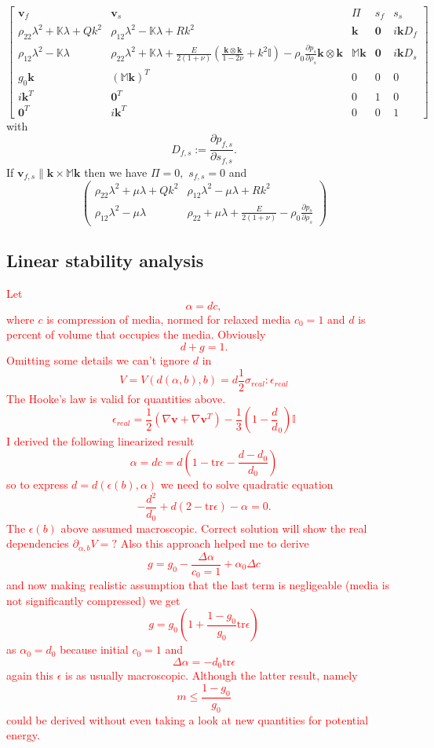 \documentclass[12pt]{article}
\numberwithin{theorem}{section}
\begin{document}
\[\left[\begin{array}{ccccc}
\mathbf{v}_f & \mathbf{v}_s & \Pi & s_f & s_s \\
\rho_{22}\lambda^2 + \mathbb{K}\lambda + Qk^2 &
\rho_{12}\lambda^2 - \mathbb{K}\lambda + Rk^2 &
\mathbf{k} & \mathbf{0} & i\mathbf{k}D_f \\
\rho_{12}\lambda^2 - \mathbb{K}\lambda &
\rho_{22}\lambda^2 + \mathbb{K}\lambda 
+ \frac{E}{2(1+\nu)}\left(\frac{\mathbf{k}\otimes\mathbf{k}}{1-2\nu}+ k^2 \mathbb{I}\right)-\rho_0 \frac{\partial p_s}{\partial \rho_s} \mathbf{k}\otimes\mathbf{k}
&
\mathbb{M}\mathbf{k} & \mathbf{0} & i\mathbf{k}D_s \\
g_0\mathbf{k} & (\mathbb{M}\mathbf{k})^T & 0 & 0 & 0 \\
i\mathbf{k}^T & \mathbf{0}^T & 0 & 1 & 0\\
\mathbf{0}^T & i\mathbf{k}^T & 0 & 0 & 1
\end{array}\right]
\]
with \[D_{f,s}:= \frac{\partial p_{f,s}}{\partial s_{f,s}}.\]
If $\mathbf{v}_{f,s} \parallel \mathbf{k} \times \mathbb{M} \mathbf{k}$ then we have $\Pi = 0,$ $s_{f,s} =0$ and 
\[\left(\begin{array}{cc}
\rho_{22}\lambda^2 + \mu \lambda + Qk^2 & \rho_{12}\lambda^2 - \mu \lambda + Rk^2 \\
\rho_{12}\lambda^2 - \mu\lambda & \rho_{22} + \mu \lambda + \frac{E}{2(1 + \nu)}-\rho_0\frac{\partial p_s}{\partial \rho_s}
\end{array}\right)\]

\subsection{Linear stability analysis} 
\textcolor{red}{Let
\[\alpha = dc,\] where $c$ is compression of media, normed for relaxed media $c_0 = 1$ and $d$ is percent of volume that occupies the media. Obviously
\[d + g = 1.\]
Omitting some details we can't ignore $d$ in 
\[V = V(d(\alpha, b), b) = d\frac12 \sigma_{real} : \epsilon_{real}\]
The Hooke's law is valid for quantities above.
\[\epsilon_{real} = \frac12(\nabla \mathbf{v} +\nabla \mathbf{v}^T) - \frac13\left(1 - \frac{d}d_0\right) \mathbb{I}\]
I derived the following linearized result 
\[\alpha = dc = d\left(1 - \mathrm{tr} \epsilon - \frac{d-d_0}{d_0}\right)\] so to express $d=d(\epsilon(b), \alpha)$ we need to solve quadratic equation
\[-\frac{d^2}{d_0} + d(2-\mathrm{tr}\epsilon) - \alpha = 0.\]
The $\epsilon(b)$ above assumed macroscopic.
Correct solution will show the real dependencies
$\partial_{\alpha, b} V = ?$
Also this approach helped me to derive
\[g = g_0 - \frac{\Delta \alpha}{c_0 = 1} + \alpha_0 \Delta c\] and now making realistic assumption that the last term is negligeable (media is not significantly compressed) we get
\[g = g_0\left(1 + \frac{1-g_0}{g_0} \mathrm{tr} \epsilon\right)\]
as $\alpha_0 = d_0$ because initial $c_0 = 1$ and \[\Delta \alpha = - d_0 \mathrm{tr}\epsilon\]
again this $\epsilon$ is as usually macroscopic.
Although the latter result, namely 
\[m \le \frac{1-g_0}{g_0}\] could be derived without even taking a look at new quantities for potential energy.
}
\end{document}

